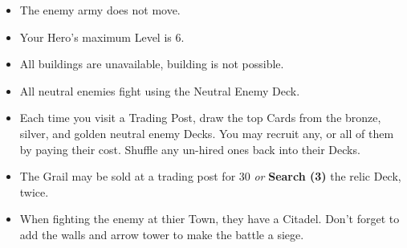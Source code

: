 \begin{multicols}{2}
\begin{itemize}
  \item The enemy army does not move.
  \item Your Hero's maximum Level is 6.
  \item All buildings are unavailable, building is not possible.
  \item All neutral enemies fight using the Neutral Enemy Deck.
  \item Each time you visit a Trading Post, draw the top Cards from the  bronze,  silver, and  golden neutral enemy Decks.
    You may recruit any, or all of them by paying their cost.
    Shuffle any un-hired ones back into their Decks.
  \item The Grail may be sold at a trading post for 30  \textit{or} \textbf{Search (3)} the relic Deck, twice.
  \item When fighting the enemy at thier Town, they have a Citadel.
    Don't forget to add the walls and arrow tower to make the battle a siege.
\end{itemize}

\end{multicols}


\newpage

